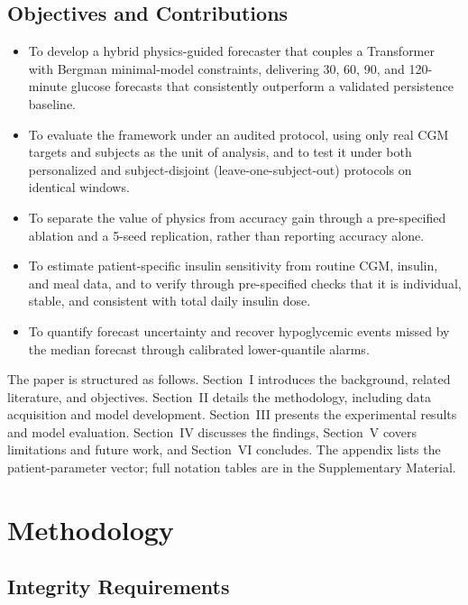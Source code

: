\documentclass[journal]{IEEEtran}
\begin{document}
\subsection{Objectives and Contributions}
\begin{itemize}
\sloppy
\item To develop a hybrid physics-guided forecaster that couples a Transformer with Bergman minimal-model constraints, delivering 30, 60, 90, and 120-minute glucose forecasts that consistently outperform a validated persistence baseline.
\item To evaluate the framework under an audited protocol, using only real CGM targets and subjects as the unit of analysis, and to test it under both personalized and subject-disjoint (leave-one-subject-out) protocols on identical windows.
\item To separate the value of physics from accuracy gain through a pre-specified ablation and a 5-seed replication, rather than reporting accuracy alone.
\item To estimate patient-specific insulin sensitivity from routine CGM, insulin, and meal data, and to verify through pre-specified checks that it is individual, stable, and consistent with total daily insulin dose.
\item To quantify forecast uncertainty and recover hypoglycemic events missed by the median forecast through calibrated lower-quantile alarms.
\end{itemize}

The paper is structured as follows. Section~I introduces the background, related literature, and objectives. Section~II details the methodology, including data acquisition and model development. Section~III presents the experimental results and model evaluation. Section~IV discusses the findings, Section~V covers limitations and future work, and Section~VI concludes. The appendix lists the patient-parameter vector; full notation tables are in the Supplementary Material.


\section{Methodology}

\subsection{Integrity Requirements}
\end{document}
